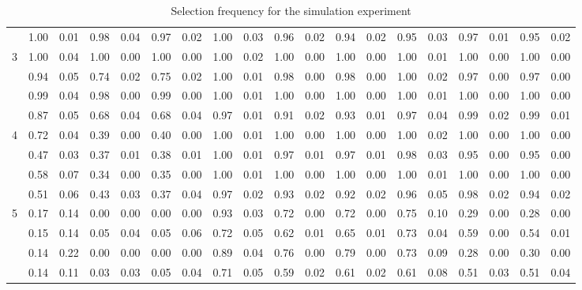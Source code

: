 \documentclass[authoryear, review, 11pt]{elsarticle}
\begin{document}
\begin{table}
\begin{center}
{\begin{tabular}{ccc|cc|cc|cc|cc|cc|cc|cc|cc}
   & 1.00 & 0.01 & 0.98 & 0.04 & 0.97 & 0.02 & 1.00 & 0.03 & 0.96 & 0.02 & 0.94 & 0.02 & 0.95 & 0.03 & 0.97 & 0.01 & 0.95 & 0.02 \\ 
   \cline{2-19}
   \multirow{4}{*}{3} & 1.00 & 0.04 & 1.00 & 0.00 & 1.00 & 0.00 & 1.00 & 0.02 & 1.00 & 0.00 & 1.00 & 0.00 & 1.00 & 0.01 & 1.00 & 0.00 & 1.00 & 0.00 \\ 
   & 0.94 & 0.05 & 0.74 & 0.02 & 0.75 & 0.02 & 1.00 & 0.01 & 0.98 & 0.00 & 0.98 & 0.00 & 1.00 & 0.02 & 0.97 & 0.00 & 0.97 & 0.00 \\ 
   & 0.99 & 0.04 & 0.98 & 0.00 & 0.99 & 0.00 & 1.00 & 0.01 & 1.00 & 0.00 & 1.00 & 0.00 & 1.00 & 0.01 & 1.00 & 0.00 & 1.00 & 0.00 \\ 
   & 0.87 & 0.05 & 0.68 & 0.04 & 0.68 & 0.04 & 0.97 & 0.01 & 0.91 & 0.02 & 0.93 & 0.01 & 0.97 & 0.04 & 0.99 & 0.02 & 0.99 & 0.01 \\ 
   \cline{2-19}
   \multirow{4}{*}{4} & 0.72 & 0.04 & 0.39 & 0.00 & 0.40 & 0.00 & 1.00 & 0.01 & 1.00 & 0.00 & 1.00 & 0.00 & 1.00 & 0.02 & 1.00 & 0.00 & 1.00 & 0.00 \\ 
   & 0.47 & 0.03 & 0.37 & 0.01 & 0.38 & 0.01 & 1.00 & 0.01 & 0.97 & 0.01 & 0.97 & 0.01 & 0.98 & 0.03 & 0.95 & 0.00 & 0.95 & 0.00 \\ 
   & 0.58 & 0.07 & 0.34 & 0.00 & 0.35 & 0.00 & 1.00 & 0.01 & 1.00 & 0.00 & 1.00 & 0.00 & 1.00 & 0.01 & 1.00 & 0.00 & 1.00 & 0.00 \\ 
   & 0.51 & 0.06 & 0.43 & 0.03 & 0.37 & 0.04 & 0.97 & 0.02 & 0.93 & 0.02 & 0.92 & 0.02 & 0.96 & 0.05 & 0.98 & 0.02 & 0.94 & 0.02 \\ 
   \cline{2-19}
   \multirow{4}{*}{5} & 0.17 & 0.14 & 0.00 & 0.00 & 0.00 & 0.00 & 0.93 & 0.03 & 0.72 & 0.00 & 0.72 & 0.00 & 0.75 & 0.10 & 0.29 & 0.00 & 0.28 & 0.00 \\ 
   & 0.15 & 0.14 & 0.05 & 0.04 & 0.05 & 0.06 & 0.72 & 0.05 & 0.62 & 0.01 & 0.65 & 0.01 & 0.73 & 0.04 & 0.59 & 0.00 & 0.54 & 0.01 \\ 
   & 0.14 & 0.22 & 0.00 & 0.00 & 0.00 & 0.00 & 0.89 & 0.04 & 0.76 & 0.00 & 0.79 & 0.00 & 0.73 & 0.09 & 0.28 & 0.00 & 0.30 & 0.00 \\ 
   & 0.14 & 0.11 & 0.03 & 0.03 & 0.05 & 0.04 & 0.71 & 0.05 & 0.59 & 0.02 & 0.61 & 0.02 & 0.61 & 0.08 & 0.51 & 0.03 & 0.51 & 0.04 \\ 
  \end{tabular}}
		\caption{Selection frequency for the simulation experiment\label{table:selection}}
		\end{center}
		\end{table}
		
\end{document}
